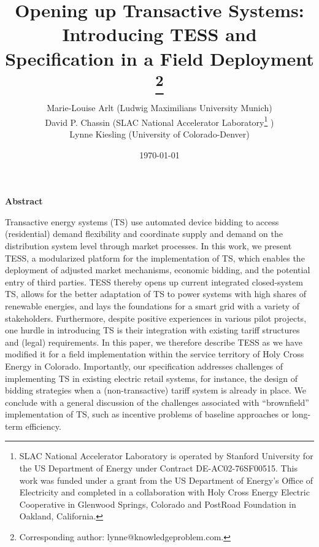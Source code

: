 \documentclass[12pt]{article}%
\begin{document}
\setcounter{page}{0}



\singlespacing

\title{
Opening up Transactive Systems: Introducing TESS and Specification in a Field Deployment
\thanks{Corresponding author: lynne@knowledgeproblem.com. 
} 
\\ }

\date{\today}
\author{Marie-Louise Arlt (Ludwig Maximilians University Munich) \\ David P. Chassin (SLAC National Accelerator Laboratory\footnote{SLAC National Accelerator Laboratory is operated by Stanford University for the US Department of Energy under Contract DE-AC02-76SF00515. This work was funded under a grant from the US Department of Energy's Office of Electricity and completed in a collaboration with Holy Cross Energy Electric Cooperative in Glenwood Springs, Colorado and PostRoad Foundation in Oakland, California.} ) \\ Lynne Kiesling (University of Colorado-Denver) \\}  
\maketitle

\thispagestyle{empty}

\sloppy%


\thispagestyle{empty}


\singlespacing
\begin{center}
\large \textbf{Abstract}
\end{center}

\noindent 
Transactive energy systems (TS) use automated device bidding to access (residential) demand flexibility and coordinate supply and demand on the distribution system level through market processes. 
In this work, we present TESS, a modularized platform for the implementation of TS, which enables the deployment of adjusted market mechanisms, economic bidding, and the potential entry of third parties. TESS thereby opens up current integrated closed-system TS, allows for the better adaptation of TS to power systems with high shares of renewable energies, and lays the foundations for a smart grid with a variety of stakeholders.
Furthermore, despite positive experiences in various pilot projects, one hurdle in introducing TS is their integration with existing tariff structures and (legal) requirements. In this paper, we therefore describe TESS as we have modified it for a field implementation within the service territory of Holy Cross Energy in Colorado. Importantly, our specification addresses challenges of implementing TS in existing electric retail systems, for instance, the design of bidding strategies when a (non-transactive) tariff system is already in place.
We conclude with a general discussion of the challenges associated with ``brownfield'' implementation of TS, such as incentive problems of baseline approaches or long-term efficiency.
\end{document}

